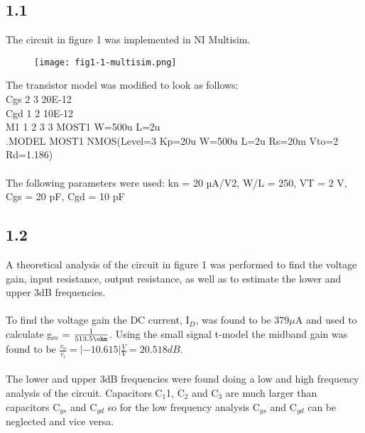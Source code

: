 \subsection*{1.1}
  The circuit in figure 1 was implemented in NI Multisim.
    \begin{figure}[h!]
        \centering
        \texttt{[image: fig1-1-multisim.png]}
    \end{figure} 
  The  transistor  model was modified to look as follows:\\
  Cgs  2 3 20E-12\\ 
  Cgd 1 2 10E-12\\
  M1 1 2 3 3 MOST1 W=500u L=2u\\
  .MODEL MOST1 NMOS(Level=3 Kp=20u W=500u L=2u Rs=20m Vto=2 Rd=1.186)\\\\

  The following parameters were used: kn =  20  µA/V2,  W/L =  250,  VT =  2  V,  Cgs =  20  pF, Cgd = 10 pF\\

\subsection*{1.2}

  A theoretical analysis of the circuit in figure 1 was performed to find the voltage gain, input resistance, output resistance, as well as to estimate the lower and upper 3dB frequencies.\\\\

  To find the voltage gain the DC current, I$_D$, was found to be 379$\mu$A and used to calculate g$_m$ = $\frac{1}{513.5 \ohm}$. Using the small signal t-model the midband gain was found to be $\frac{v_o}{v_i} = |-10.615| \frac{V}{V} = 20.518 dB$.\\\\

  The lower and upper 3dB frequencies were found doing a low and high frequency analysis of the circuit. Capacitors C$_1$1, C$_2$ and C$_3$ are much larger than capacitors C$_{gs}$ and C$_{gd}$ so for the low frequency analysis C$_{gs}$ and C$_{gd}$ can be neglected and vice versa.\\

